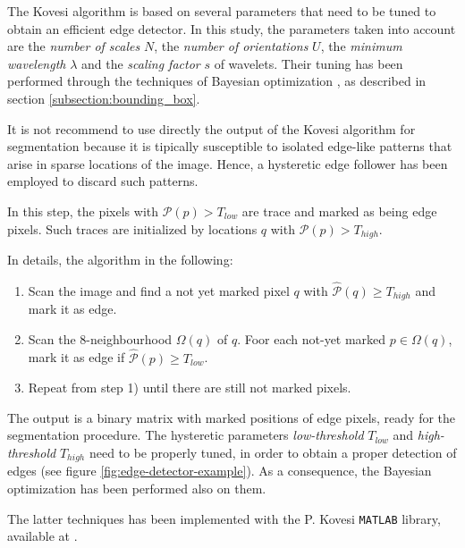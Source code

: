         \par{
        	The Kovesi algorithm is based on several parameters that need to be tuned to obtain an efficient edge detector. In this study, the parameters taken into account are the \emph{number of scales} $N$, the \emph{number of orientations} $U$, the \emph{minimum wavelength} $\lambda$ and the \emph{scaling factor} $s$ of wavelets. Their tuning has been performed through the techniques of Bayesian optimization \cite{arXiv:2012arXiv1206.2944S,arXiv:2018arXiv180702811F, matlab:bayesian-opt}, as described in section \ref{subsection:bounding_box}.
        }
        \par{
            It is not recommend to use directly the output of the Kovesi algorithm for segmentation because it is tipically susceptible to isolated edge-like patterns that arise in sparse locations of the image. Hence, a hysteretic edge follower has been employed to discard such patterns.
        }
        \par{
        	In this step, the pixels with $\mathcal{P}(p) > T_{low}$
        	are trace and marked as being edge pixels. Such traces are initialized by locations $q$ with $\mathcal{P}(p) > T_{high}$.
        }
    	\par{
            In details, the algorithm in the following:
        }
		\begin{enumerate}
			\item Scan the image and find a not yet marked pixel $q$ with $\hat{\mathcal{P}}(q) \ge T_{high}$ and mark it as edge.
			\item Scan the $8$-neighbourhood $\Omega(q)$ of $q$. Foor each not-yet marked $p \in \Omega(q)$, mark it as edge if $\hat{\mathcal{P}}(p) \ge T_{low}$.
			\item Repeat from step 1) until there are still not marked pixels.
		\end{enumerate}
		\par{
			The output is a binary matrix with marked positions of edge pixels, ready for the segmentation procedure. The hysteretic parameters \emph{low-threshold} $T_{low}$ and \emph{high-threshold} $T_{high}$ need to be properly tuned, in order to obtain a proper detection of edges (see figure \ref{fig:edge-detector-example}). As a consequence, the Bayesian optimization has been performed also on them.
        }
    	\par{
    		The latter techniques has been implemented with the P. Kovesi \texttt{MATLAB} library, available at \cite{kovesilibrary}.
    	}
